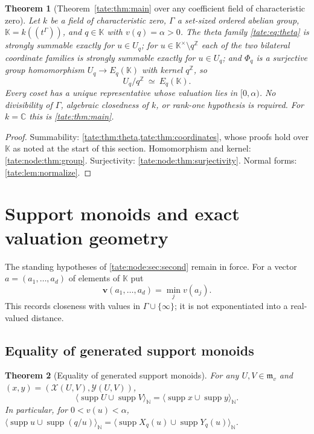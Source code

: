 \documentclass[11pt,letterpaper]{article}
\newtheorem{theorem}{Theorem}[section]
\theoremstyle{definition}
\newcommand{\C}{\mathbb C}
\newcommand{\Z}{\mathbb Z}
\newcommand{\N}{\mathbb N}
\newcommand{\supp}{\operatorname{supp}}
\newcommand{\m}{\mathfrak m}
\newcommand{\SpanM}[1]{\langle #1\rangle_{\N}}
\newcommand{\X}{\mathcal X}
\newcommand{\Y}{\mathcal Y}
\newcommand{\KK}{\mathbb K}
\newcommand{\bv}{\mathbf v}
\begin{document}
\begin{theorem}[Theorem~\ref{tate:thm:main} over any coefficient field of characteristic zero]
\label{tate:node:thm:main}
Let $k$ be a field of characteristic zero, $\Gamma$ a set-sized ordered
abelian group, $\KK=k((t^\Gamma))$, and $q\in\KK$ with $v(q)=\alpha>0$.
The theta family \eqref{tate:eq:theta} is strongly summable exactly for
$u\in U_q$; for $u\in\KK^\times\setminus q^\Z$ each of the two bilateral coordinate
families is strongly summable exactly for $u\in U_q$; and $\Phi_q$ is a
surjective group homomorphism $U_q\to E_q(\KK)$ with kernel $q^\Z$, so
\[
 U_q/q^\Z\ \simeq\ E_q(\KK).
\]
Every coset has a unique representative whose valuation lies in
$[0,\alpha)$. No divisibility of $\Gamma$, algebraic closedness of $k$, or
rank-one hypothesis is required. For $k=\C$ this is \cref{tate:thm:main}.
\end{theorem}

\begin{proof}
Summability: \cref{tate:thm:theta,tate:thm:coordinates}, whose proofs hold
over $\KK$ as noted at the start of this section. Homomorphism and kernel:
\cref{tate:node:thm:group}. Surjectivity: \cref{tate:node:thm:surjectivity}.
Normal forms: \cref{tate:lem:normalize}.
\end{proof}

\section{Support monoids and exact valuation geometry}\label{tate:node:sec:metric}

The standing hypotheses of \cref{tate:node:sec:second} remain in force. For
a vector $a=(a_1,\dots,a_d)$ of elements of $\KK$ put
\[
 \bv(a_1,\ldots,a_d)=\min_jv(a_j).
\]
This records closeness with values in $\Gamma\cup\{\infty\}$; it is not
exponentiated into a real-valued distance.

\subsection{Equality of generated support monoids}

\begin{theorem}[Equality of generated support monoids]\label{tate:node:thm:support}
For any $U,V\in\m_v$ and $(x,y)=(\X(U,V),\Y(U,V))$,
\begin{equation}
 \SpanM{\supp U\cup\supp V}
 =\SpanM{\supp x\cup\supp y}.\label{tate:node:eq:support-equality}
\end{equation}
In particular, for $0<v(u)<\alpha$,
$\SpanM{\supp u\cup\supp(q/u)}=\SpanM{\supp X_q(u)\cup\supp Y_q(u)}$.
\end{theorem}
\end{document}
